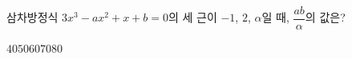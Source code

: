 삼차방정식 $3x^3-ax^2+x+b=0$의 세 근이 $-1$, $2$, $\alpha$일 때, $\dfrac{ab}{\alpha}$의 값은? 
\begin{choices32}{$40$}{$50$}{$60$}{$70$}{$80$}\end{choices32}
